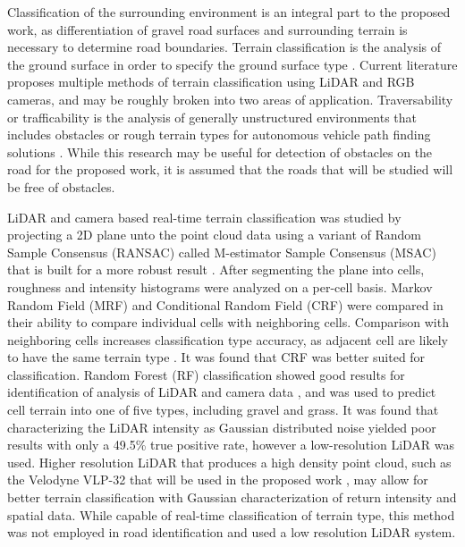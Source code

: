 \documentclass[journal,onecolumn]{IEEEtran}
\begin{document}
{	Classification of the surrounding environment is an integral part to the proposed work, as differentiation of gravel road surfaces and surrounding terrain is necessary to determine road boundaries. Terrain classification is the analysis of the ground surface in order to specify the ground surface type \cite{laible_3d_2012,laible_terrain_2013,laible_map_building,rasmussen_combining_2002,reymann_improving_2015,walas_terrain_2014,wietrzykowski_boosting_2014,wang_road_nodate}. Current literature proposes multiple methods of terrain classification using LiDAR and RGB cameras, and may be roughly broken into two areas of application. Traversability or trafficability is the analysis of generally unstructured environments that includes obstacles or rough terrain types for autonomous vehicle path finding solutions  \cite{schilling_geometric_2017,ojeda_terrain_2006,coombs_driving_2000,stavens_self-supervised_nodate,belter_rough_2010,bartoszyk_terrain-aware_2017,noauthor_fusion_nodate,li_rugged_2019,wilson_terrain_2014,siva_robot_2019}. While this research may be useful for detection of obstacles on the road for the proposed work, it is assumed that the roads that will be studied will be free of obstacles.
	
	LiDAR and camera based real-time terrain classification was studied by projecting a 2D plane unto the point cloud data using a variant of Random Sample Consensus (RANSAC) called M-estimator Sample Consensus (MSAC) \cite{mijakovska_generating_2014} that is built for a more robust result \cite{laible_3d_2012,laible_map_building,laible_terrain_2013}. After segmenting the plane into cells, roughness and intensity histograms were analyzed on a per-cell basis. Markov Random Field (MRF) \cite{chellappa_classification_1985} and Conditional Random Field (CRF) \cite{wallach_conditional_nodate} were compared in their ability to compare individual cells with neighboring cells. Comparison with neighboring cells increases classification type accuracy, as adjacent cell are likely to have the same terrain type \cite{haselich_terrain_2011,zhao_fusion_2014}. It was found that CRF was better suited for classification.	Random Forest (RF) classification showed good results for identification of analysis of LiDAR and camera data \cite{breiman_random_2001}, and was used to predict cell terrain into one of five types, including gravel and grass. It was found that characterizing the LiDAR intensity as Gaussian distributed noise yielded poor results with only a 49.5\% true positive rate, however a low-resolution LiDAR was used. Higher resolution LiDAR that produces a high density point cloud, such as the Velodyne VLP-32 that will be used in the proposed work \cite{vlp_32c}, may allow for better terrain classification with Gaussian characterization of return intensity and spatial data. While capable of real-time classification of terrain type, this method was not employed in road identification and used a low resolution LiDAR system.
	
}
\end{document}
